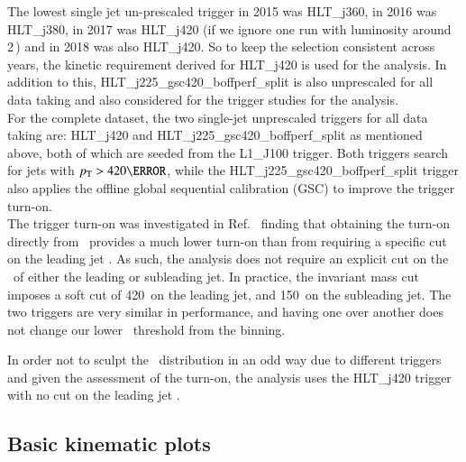 The lowest single jet un-prescaled trigger in 2015 was HLT\_j360, in
2016 was HLT\_j380, in 2017 was HLT\_j420 (if we ignore one run with
luminosity around 2\,\ipb ) and in 2018 was also HLT\_j420. So to keep
the selection consistent across years, the kinetic requirement derived
for HLT\_j420 is used for the analysis. In addition to this,
HLT\_j225\_gsc420\_boffperf\_split is also unprescaled for all data
taking and also considered for the trigger studies for the analysis. \\

For the complete \RunTwo dataset, the two single-jet unprescaled
triggers for all data taking are: HLT\_j420 and
HLT\_j225\_gsc420\_boffperf\_split as mentioned above, both of which are
seeded from the L1\_J100 trigger. Both triggers search for jets with
$\pT > 420 \GeV$, while the HLT\_j225\_gsc420\_boffperf\_split trigger
also applies the offline global sequential calibration (GSC) to improve
the trigger turn-on.\\

The trigger turn-on was investigated in Ref.~\cite{Nishu:2646455}
finding that  obtaining the turn-on directly from \mjj\ provides a much
lower turn-on than from requiring a specific cut on the leading jet \pT.
As such, the analysis does not require an explicit cut on the \pT\ of
either the leading or subleading jet. In practice, the invariant mass
cut imposes a soft cut of 420~\GeV on the leading jet, and 150~\GeV on
the subleading jet. The two triggers are very similar in performance,
and having one over another does not change our lower \mjj\ threshold
from the binning.


In order not to sculpt the \mjj\ distribution in an odd way due to
different triggers and given the assessment of the turn-on, the analysis
uses the HLT\_j420 trigger with no cut on the leading jet \pT.



\subsection{Basic kinematic plots}
\label{sec:kinematic_distributions}


